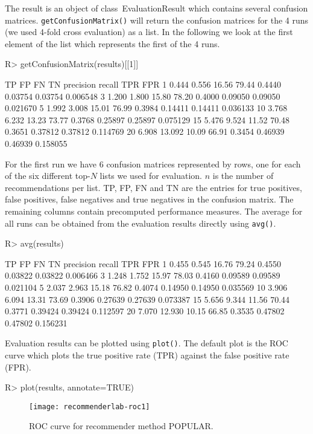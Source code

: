 \documentclass[nojss]{jss}
\newcommand{\class}[1]{\mbox{\textsf{#1}}}
\newcommand{\func}[1]{\mbox{\texttt{#1()}}}
\begin{document}
The result is an object of class~\class{EvaluationResult} which
contains several confusion matrices. \func{getConfusionMatrix}
will return the confusion matrices for the 4 runs
(we used 4-fold cross evaluation) as a list.
In the following we look at the first element of the list which
represents the first of the 4 runs.


\begin{Schunk}
\begin{Sinput}
R> getConfusionMatrix(results)[[1]]
\end{Sinput}
\begin{Soutput}
      TP     FP    FN    TN precision  recall     TPR      FPR
1  0.444  0.556 16.56 79.44    0.4440 0.03754 0.03754 0.006548
3  1.200  1.800 15.80 78.20    0.4000 0.09050 0.09050 0.021670
5  1.992  3.008 15.01 76.99    0.3984 0.14411 0.14411 0.036133
10 3.768  6.232 13.23 73.77    0.3768 0.25897 0.25897 0.075129
15 5.476  9.524 11.52 70.48    0.3651 0.37812 0.37812 0.114769
20 6.908 13.092 10.09 66.91    0.3454 0.46939 0.46939 0.158055
\end{Soutput}
\end{Schunk}

For the first run we have 6 confusion matrices represented by rows, one for each
of the six different top-$N$ lists we used for evaluation.
$n$ is the number of recommendations per list. TP, FP, FN and TN are the
entries for
true positives, false positives, false negatives and true negatives in
the confusion matrix. The remaining columns contain precomputed performance
measures. The average for all runs can be obtained
from the evaluation results directly using \func{avg}.

\begin{Schunk}
\begin{Sinput}
R> avg(results)
\end{Sinput}
\begin{Soutput}
      TP     FP    FN    TN precision  recall     TPR      FPR
1  0.455  0.545 16.76 79.24    0.4550 0.03822 0.03822 0.006466
3  1.248  1.752 15.97 78.03    0.4160 0.09589 0.09589 0.021104
5  2.037  2.963 15.18 76.82    0.4074 0.14950 0.14950 0.035569
10 3.906  6.094 13.31 73.69    0.3906 0.27639 0.27639 0.073387
15 5.656  9.344 11.56 70.44    0.3771 0.39424 0.39424 0.112597
20 7.070 12.930 10.15 66.85    0.3535 0.47802 0.47802 0.156231
\end{Soutput}
\end{Schunk}

Evaluation results can be plotted using \func{plot}. The default
plot is the ROC curve which plots the true positive rate (TPR) against the
false positive rate (FPR).
\begin{Schunk}
\begin{Sinput}
R> plot(results, annotate=TRUE)
\end{Sinput}
\end{Schunk}
\begin{figure}
\centerline{\texttt{[image: recommenderlab-roc1]}}
\caption{ROC curve for recommender method POPULAR.}
\label{fig:roc1}
\end{figure}
\end{document}
